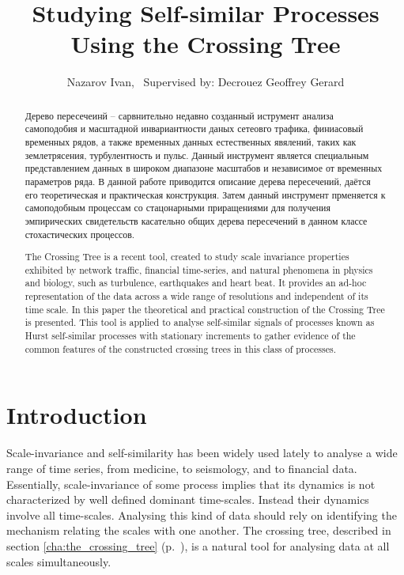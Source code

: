 \documentclass[a4paper,14pt]{extreport}
\title{Studying Self-similar Processes Using the Crossing Tree}
\author{Nazarov Ivan, \rus{101мНОД(ИССА)}\
	{\small Supervised by: Decrouez Geoffrey Gerard}}
\begin{document}

\clearpage


\clearpage

\begin{abstract}
Дерево пересечеинй -- сарвнительно недавно созданный иструмент анализа самоподобия
и масштадной инвариантности даных сетеовго трафика, финиасовый временных рядов, а
также временных данных естественных явялений, таких как землетрясения, турбулентность
и пульс. Данный инструмент является специальным представлением данных в широком
диапазоне масштабов и независимое от временных параметров ряда. В данной работе
приводится описание дерева пересечений, даётся его теоретическая и практическая
конструкция. Затем данный инструмент прменяется к самоподобным процессам со стацонарными
приращениями для получения эмпирических свидетельств касательно общих 
дерева пересечений в данном классе стохастических процессов.
\end{abstract}

\begin{abstract}
The Crossing Tree is a recent tool, created to study scale invariance properties
exhibited by network traffic, financial time-series, and natural phenomena in physics
and biology, such as turbulence, earthquakes and heart beat. It provides an ad-hoc
representation of the data across a wide range of resolutions and independent of
its time scale. In this paper the theoretical and practical construction of the Crossing
Tree is presented. This tool is applied to analyse self-similar signals of processes
known as Hurst self-similar processes with stationary increments to gather evidence 
of the common features of the constructed crossing trees in this class of processes.
\end{abstract}

\tableofcontents
\clearpage
{}


\chapter{Introduction} %
\label{cha:introduction}

Scale-invariance and self-similarity has been widely used lately to analyse a wide
range of time series, from medicine, to seismology, and to financial data.
Essentially, scale-invariance of some process implies that its dynamics is not
characterized by well defined dominant time-scales. Instead their dynamics
involve all time-scales. Analysing this kind of data should rely on identifying
the mechanism relating the scales with one another. The crossing tree, described in
section \ref{cha:the_crossing_tree} (p.~\pageref{cha:the_crossing_tree}), is
a natural tool for analysing data at all scales simultaneously.
\end{document}
